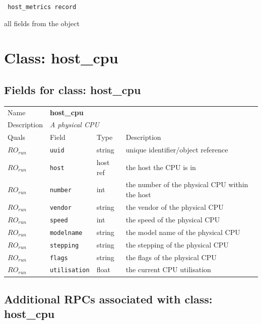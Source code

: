 \vspace{0.3cm}

{\tt 
host\_metrics record
}


all fields from the object
\vspace{0.3cm}
\vspace{0.3cm}
\vspace{0.3cm}

\vspace{1cm}
\newpage
\section{Class: host\_cpu}
\subsection{Fields for class: host\_cpu}
\begin{longtable}{|lllp{}|}
\hline
\multicolumn{1}{|l}{Name} & \multicolumn{3}{l|}{\bf host\_cpu} \\
\multicolumn{1}{|l}{Description} & \multicolumn{3}{l|}{\parbox{11cm}{\em A physical CPU}} \\
\hline
Quals & Field & Type & Description \\
\hline
$\mathit{RO}_\mathit{run}$ &  {\tt uuid} & string & unique identifier/object reference \\
$\mathit{RO}_\mathit{run}$ &  {\tt host} & host ref & the host the CPU is in \\
$\mathit{RO}_\mathit{run}$ &  {\tt number} & int & the number of the physical CPU within the host \\
$\mathit{RO}_\mathit{run}$ &  {\tt vendor} & string & the vendor of the physical CPU \\
$\mathit{RO}_\mathit{run}$ &  {\tt speed} & int & the speed of the physical CPU \\
$\mathit{RO}_\mathit{run}$ &  {\tt modelname} & string & the model name of the physical CPU \\
$\mathit{RO}_\mathit{run}$ &  {\tt stepping} & string & the stepping of the physical CPU \\
$\mathit{RO}_\mathit{run}$ &  {\tt flags} & string & the flags of the physical CPU \\
$\mathit{RO}_\mathit{run}$ &  {\tt utilisation} & float & the current CPU utilisation \\
\hline
\end{longtable}
\subsection{Additional RPCs associated with class: host\_cpu}
